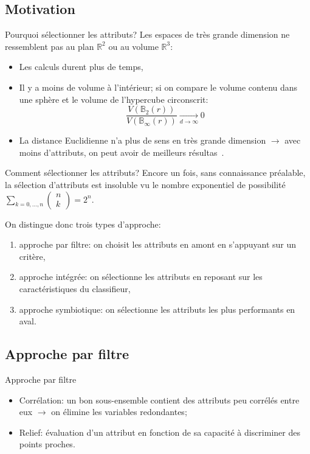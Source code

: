 \documentclass[8pt]{beamer}
\begin{document}
	\subsection[motivation]{Motivation}
	\begin{frame}{Pourquoi sélectionner les attributs?}
		Les espaces de très grande dimension ne ressemblent pas au plan $\mathbb{R}^2$ ou au volume  $\mathbb{R}^3$:
		\begin{itemize}
			\item <1-> Les calculs durent plus de temps,
			\item <2-> Il y a moins de volume à l'intérieur; si on compare le volume contenu dans une sphère et le volume de l'hypercube circonscrit:
			$$\frac{V(\mathbb{B}_{2}(r))}{V(\mathbb{B}_{\infty}(r))}\xrightarrow[d \to \infty]{} 0$$
			\item <3-> La distance Euclidienne n'a plus de sens en très grande dimension $\longrightarrow$ avec moins d'attributs, on peut avoir de meilleurs résultas~\cite{Domingos:2012:FUT:2347736.2347755}.
		\end{itemize}
	\end{frame}

	\begin{frame}{Comment sélectionner les attributs?}
		Encore un fois, sans connaissance préalable, la sélection d'attributs est insoluble vu le nombre exponentiel de possibilité $\sum_{k=0,\dots,n} \begin{pmatrix}
		n\\
		k
		\end{pmatrix} = 2^n$.

		On distingue donc trois types d'approche:
		\begin{enumerate}
			\item<1-> approche par filtre: on choisit les attributs en amont en s'appuyant sur un critère,
			\item<2-> approche intégrée: on sélectionne les attributs en reposant sur les caractéristiques du classifieur,
			\item<3-> approche symbiotique: on sélectionne les attributs les plus performants en aval.
		\end{enumerate}
	\end{frame}

	\subsection[filter approach]{Approche par filtre}
	\begin{frame}{Approche par filtre}
		\begin{itemize}
			\item  Corrélation: un bon sous-ensemble contient des attributs peu corrélés entre eux $\longrightarrow$ on élimine les variables redondantes;
			\item  Relief: évaluation d'un attribut en fonction de sa capacité à discriminer des points proches.
		\end{itemize}
	\end{frame}
\end{document}

